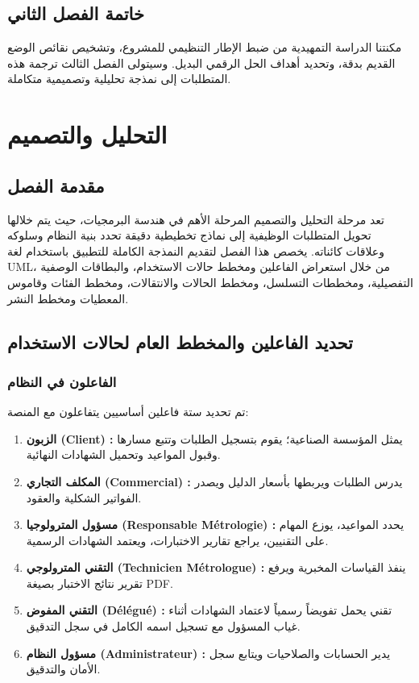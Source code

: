 \documentclass{bts-report-ar}
\begin{document}
\section*{خاتمة الفصل الثاني}
مكنتنا الدراسة التمهيدية من ضبط الإطار التنظيمي للمشروع، وتشخيص نقائص الوضع القديم بدقة، وتحديد أهداف الحل الرقمي البديل. وسيتولى الفصل الثالث ترجمة هذه المتطلبات إلى نمذجة تحليلية وتصميمية متكاملة.


\chapter{التحليل والتصميم}

\section*{مقدمة الفصل}
تعد مرحلة التحليل والتصميم المرحلة الأهم في هندسة البرمجيات، حيث يتم خلالها تحويل المتطلبات الوظيفية إلى نماذج تخطيطية دقيقة تحدد بنية النظام وسلوكه وعلاقات كائناته. يخصص هذا الفصل لتقديم النمذجة الكاملة للتطبيق باستخدام لغة UML، من خلال استعراض الفاعلين ومخطط حالات الاستخدام، والبطاقات الوصفية التفصيلية، ومخططات التسلسل، ومخطط الحالات والانتقالات، ومخطط الفئات وقاموس المعطيات ومخطط النشر.

\section{تحديد الفاعلين والمخطط العام لحالات الاستخدام}
\subsection{الفاعلون في النظام}
تم تحديد ستة فاعلين أساسيين يتفاعلون مع المنصة:
\begin{enumerate}
  \item \textbf{الزبون (Client) :} يمثل المؤسسة الصناعية؛ يقوم بتسجيل الطلبات وتتبع مسارها وقبول المواعيد وتحميل الشهادات النهائية.
  \item \textbf{المكلف التجاري (Commercial) :} يدرس الطلبات ويربطها بأسعار الدليل ويصدر الفواتير الشكلية والعقود.
  \item \textbf{مسؤول المترولوجيا (Responsable Métrologie) :} يحدد المواعيد، يوزع المهام على التقنيين، يراجع تقارير الاختبارات، ويعتمد الشهادات الرسمية.
  \item \textbf{التقني المترولوجي (Technicien Métrologue) :} ينفذ القياسات المخبرية ويرفع تقرير نتائج الاختبار بصيغة PDF.
  \item \textbf{التقني المفوض (Délégué) :} تقني يحمل تفويضاً رسمياً لاعتماد الشهادات أثناء غياب المسؤول مع تسجيل اسمه الكامل في سجل التدقيق.
  \item \textbf{مسؤول النظام (Administrateur) :} يدير الحسابات والصلاحيات ويتابع سجل الأمان والتدقيق.
\end{enumerate}
\end{document}
